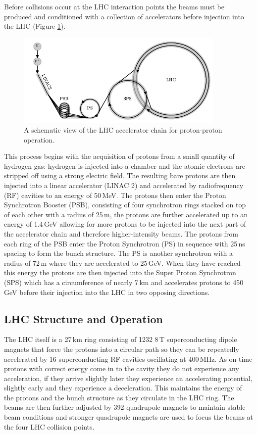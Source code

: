 Before collisions occur at the LHC interaction points the beams must be produced and conditioned with a collection of accelerators \cite{CERN_accelerator_complex} before injection into the LHC (Figure \ref{fig:apparatus:lhc_chain}).
\begin{figure}[h!]
    \includegraphics[width=0.9\textwidth]{figures/apparatus/accel_chain.pdf}
    \caption{A schematic view of the LHC accelerator chain for proton-proton operation.}
    \label{fig:apparatus:lhc_chain}
\end{figure}
This process begins with the acquisition of protons from a small quantity of hydrogen gas: hydrogen is injected into a chamber and the atomic electrons are stripped off using a strong electric field. The resulting bare protons are then injected into a linear accelerator (LINAC 2) and accelerated by radiofrequency (RF) cavities to an energy of 50\,MeV. The protons then enter the Proton Synchrotron Booster (PSB), consisting of four synchrotron rings stacked on top of each other with a radius of 25\,m, the protons are further accelerated up to an energy of 1.4\,GeV allowing for more protons to be injected into the next part of the accelerator chain and therefore higher-intensity beams.
The protons from each ring of the PSB enter the Proton Synchrotron (PS) in sequence with 25\,ns spacing to form the bunch structure. The PS is another synchrotron with a radius of 72\,m where they are accelerated to 25\,GeV. 
When they have reached this energy the protons are then injected into the Super Proton Synchrotron (SPS) which has a circumference of nearly 7\,km and accelerates protons to 450\,GeV before their injection into the LHC in two opposing directions. 


\subsection{LHC Structure and Operation}
The LHC itself is a 27\,km ring consisting of 1232 8\,T superconducting dipole magnets that force the protons into a circular path so they can be repeatedly accelerated by 16 superconducting RF cavities oscillating at 400\,MHz. As on-time protons with correct energy come in to the cavity they do not experience any acceleration, if they arrive slightly later they experience an accelerating potential, slightly early and they experience a deceleration. This maintains the energy of the protons and the bunch structure as they circulate in the LHC ring. The beams are then further adjusted by 392 quadrupole magnets to maintain stable beam conditions and stronger quadrupole magnets are used to focus the beams at the four LHC collision points.

